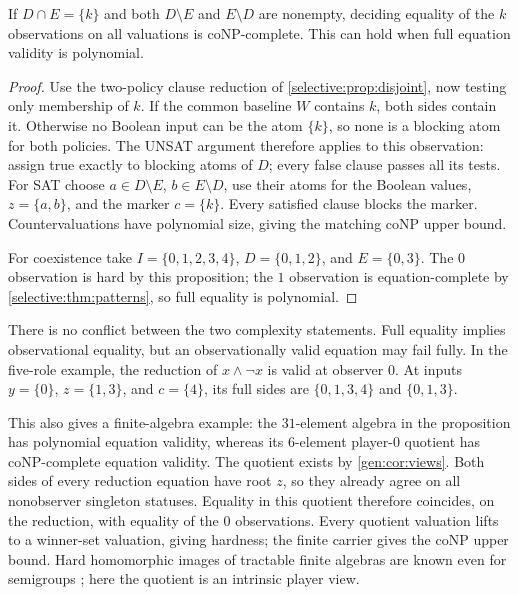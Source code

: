 \begin{proposition}
\label{selective:prop:hard-view}
If $D\cap E=\{k\}$ and both $D\setminus E$ and $E\setminus D$
are nonempty, deciding equality of the $k$ observations on all
valuations is coNP-complete. This can hold when full equation validity
is polynomial.
\end{proposition}
\begin{proof}
Use the two-policy clause reduction of
\cref{selective:prop:disjoint}, now testing only membership of $k$.
If the common baseline $W$ contains $k$, both sides contain it.
Otherwise no Boolean input can be the atom $\{k\}$, so none is a blocking atom for both policies. The UNSAT argument therefore applies to this
observation: assign true exactly to blocking atoms of $D$; every false
clause passes all its tests. For SAT choose
$a\in D\setminus E$, $b\in E\setminus D$, use their atoms for the
Boolean values, $z=\{a,b\}$, and the marker $c=\{k\}$. Every
satisfied clause blocks the marker. Countervaluations have polynomial
size, giving the matching coNP upper bound.

For coexistence take $I=\{0,1,2,3,4\}$,
$D=\{0,1,2\}$, and $E=\{0,3\}$. The $0$ observation is hard by
this proposition; the $1$ observation is equation-complete by
\cref{selective:thm:patterns}, so full equality is polynomial.
\end{proof}

There is no conflict between the two complexity statements. Full
equality implies observational equality, but an observationally valid
equation may fail fully. In the five-role example, the reduction of
$x\land\lnot x$ is valid at observer $0$. At inputs
$y=\{0\}$, $z=\{1,3\}$, and $c=\{4\}$, its full sides are
$\{0,1,3,4\}$ and $\{0,1,3\}$.

This also gives a finite-algebra example: the $31$-element algebra in
the proposition has polynomial equation validity, whereas its
$6$-element player-$0$ quotient has coNP-complete equation validity.
The quotient exists by \cref{gen:cor:views}. Both sides of every
reduction equation have root $z$, so they already agree on all
nonobserver singleton statuses. Equality in this quotient therefore
coincides, on the reduction, with equality of the $0$ observations.
Every quotient valuation lifts to a winner-set valuation, giving
hardness; the finite carrier gives the coNP upper bound. Hard
homomorphic images of tractable finite algebras are known even for
semigroups \cite{Seif2005}; here the quotient is an intrinsic player view.

